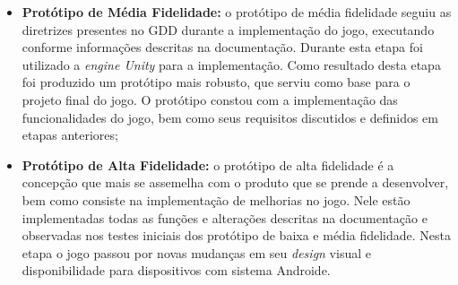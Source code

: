 \documentclass[10pt, conference, compsocconf]{IEEEtran}
\begin{document}
\begin{itemize}
	\item \textbf{Protótipo de Média Fidelidade:} o protótipo de média fidelidade seguiu as diretrizes presentes no GDD durante a implementação do jogo, executando conforme informações descritas na documentação. Durante esta etapa foi utilizado a \textit{ engine Unity} para a implementação. Como resultado desta etapa foi produzido um protótipo mais robusto, que serviu como base para o projeto final do jogo. O protótipo constou com a implementação das funcionalidades do jogo, bem como seus requisitos discutidos e definidos em etapas anteriores;
	

	\item \textbf{Protótipo de Alta Fidelidade:} o protótipo de alta fidelidade é a concepção que mais se assemelha com o produto que se prende a desenvolver, bem como consiste na implementação de melhorias no jogo. Nele estão implementadas todas as funções e alterações descritas na documentação e observadas nos testes iniciais dos protótipo de baixa e média fidelidade. Nesta etapa o jogo passou por novas mudanças em seu \textit{design} visual e disponibilidade para dispositivos  com sistema Androide.
	

	

\end{itemize}
\end{document}

